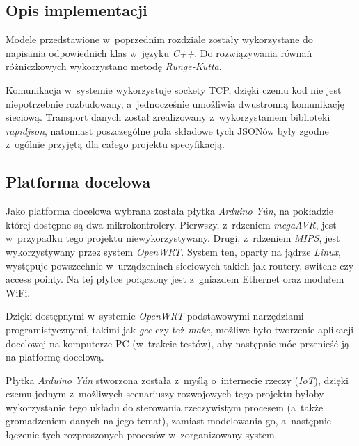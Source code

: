 \documentclass[12pt, a4paper]{article}
\begin{document}
    \subsection{Opis implementacji}
    \label{sec:opis_implementacji}
    \indent
    
    Modele przedstawione w~poprzednim rozdziale zostały wykorzystane do
    napisania odpowiednich klas w~języku \textit{C++}. Do rozwiązywania równań
    różniczkowych wykorzystano metodę \textit{Runge-Kutta}.
    
    Komunikacja w~systemie wykorzystuje sockety TCP, dzięki czemu kod nie jest
    niepotrzebnie rozbudowany, a~jednocześnie umożliwia dwustronną komunikację
    sieciową. Transport danych został zrealizowany z~wykorzystaniem biblioteki
    \textit{rapidjson}, natomiast poszczególne pola składowe tych JSONów były
    zgodne z~ogólnie przyjętą dla całego projektu specyfikacją.
    
    \newpage
    
    \subsection{Platforma docelowa}
    \label{sec:platforma_docelowa}
    \indent
    
    Jako platforma docelowa wybrana została płytka \textit{Arduino Y\'un}, na
    pokładzie której dostępne są dwa mikrokontrolery. Pierwszy, z~rdzeniem
    \textit{megaAVR}, jest w~przypadku tego projektu niewykorzystywany. Drugi,
    z~rdzeniem \textit{MIPS}, jest wykorzystywany przez system \textit{OpenWRT}.
    System ten, oparty na jądrze \textit{Linux}, występuje powszechnie
    w~urządzeniach sieciowych takich jak routery, switche czy access pointy. Na
    tej płytce połączony jest z~gniazdem Ethernet oraz modułem WiFi.
    
    Dzięki dostępnymi w~systemie \textit{OpenWRT} podstawowymi narzędziami
    programistycznymi, takimi jak \textit{gcc} czy też \textit{make}, możliwe
    było tworzenie aplikacji docelowej na komputerze PC (w~trakcie testów), aby
    następnie móc przenieść ją na platformę docelową.
    
    Płytka \textit{Arduino Y\'un} stworzona została z~myślą o~internecie rzeczy
    (\textit{IoT}), dzięki czemu jednym z~możliwych scenariuszy rozwojowych tego
    projektu byłoby wykorzystanie tego układu do sterowania rzeczywistym
    procesem (a~także gromadzeniem danych na jego temat), zamiast modelowania
    go, a~następnie łączenie tych rozproszonych procesów w~zorganizowany system.
    
\end{document}
